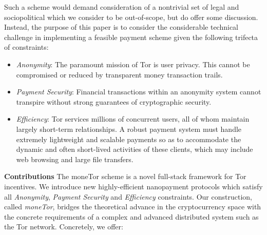 Such a scheme would demand consideration of a nontrivial set of legal and
sociopolitical which we consider to be out-of-scope, but do offer some
discussion. Instead, the purpose of this paper is to consider the considerable
technical challenge in implementing a feasible payment scheme given the
following trifecta of constraints:

\begin{itemize}
\item \emph{Anonymity}: The paramount mission of Tor is user privacy. This
  cannot be compromised or reduced by transparent money transaction trails.
\item \emph{Payment Security}: Financial transactions within an anonymity system
  cannot transpire without strong guarantees of cryptographic security.
\item \emph{Efficiency}: Tor services millions of concurrent users, all of whom
  maintain largely short-term relationships. A robust payment system must handle
  extremely lightweight and scalable payments so as to accommodate the dynamic
  and often short-lived activities of these clients, which may include web
  browsing and large file transfers.
\end{itemize}


\label{sec:Contributions}
\textbf{Contributions} The moneTor scheme is a novel full-stack framework for
Tor incentives. We introduce new highly-efficient nanopayment protocols which
satisfy all \emph{Anonymity}, \emph{Payment Security} and \emph{Efficiency}
constraints. Our construction, called \emph{moneTor}, bridges the theoretical
advance in the cryptocurrency space with the concrete requirements of a complex
and advanced distributed system such as the Tor network. Concretely, we offer:
 

